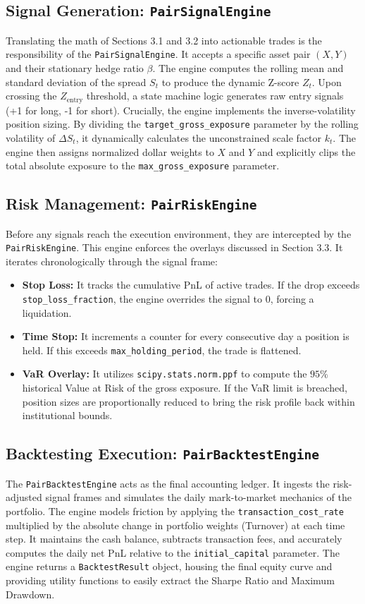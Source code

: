 \documentclass[12pt,a4paper]{article}
\begin{document}
\subsection{Signal Generation: \texttt{PairSignalEngine}}
Translating the math of Sections 3.1 and 3.2 into actionable trades is the responsibility of the \texttt{PairSignalEngine}. It accepts a specific asset pair $(X, Y)$ and their stationary hedge ratio $\beta$. 
The engine computes the rolling mean and standard deviation of the spread $S_t$ to produce the dynamic Z-score $Z_t$. Upon crossing the $Z_{\text{entry}}$ threshold, a state machine logic generates raw entry signals (+1 for long, -1 for short). Crucially, the engine implements the inverse-volatility position sizing. By dividing the \texttt{target\_gross\_exposure} parameter by the rolling volatility of $\Delta S_t$, it dynamically calculates the unconstrained scale factor $k_t$. The engine then assigns normalized dollar weights to $X$ and $Y$ and explicitly clips the total absolute exposure to the \texttt{max\_gross\_exposure} parameter.

\subsection{Risk Management: \texttt{PairRiskEngine}}
Before any signals reach the execution environment, they are intercepted by the \texttt{PairRiskEngine}. This engine enforces the overlays discussed in Section 3.3. It iterates chronologically through the signal frame:
\begin{itemize}
    \item \textbf{Stop Loss:} It tracks the cumulative PnL of active trades. If the drop exceeds \texttt{stop\_loss\_fraction}, the engine overrides the signal to $0$, forcing a liquidation.
    \item \textbf{Time Stop:} It increments a counter for every consecutive day a position is held. If this exceeds \texttt{max\_holding\_period}, the trade is flattened.
    \item \textbf{VaR Overlay:} It utilizes \texttt{scipy.stats.norm.ppf} to compute the $95\%$ historical Value at Risk of the gross exposure. If the VaR limit is breached, position sizes are proportionally reduced to bring the risk profile back within institutional bounds.
\end{itemize}

\subsection{Backtesting Execution: \texttt{PairBacktestEngine}}
The \texttt{PairBacktestEngine} acts as the final accounting ledger. It ingests the risk-adjusted signal frames and simulates the daily mark-to-market mechanics of the portfolio. 
The engine models friction by applying the \texttt{transaction\_cost\_rate} multiplied by the absolute change in portfolio weights (Turnover) at each time step. It maintains the cash balance, subtracts transaction fees, and accurately computes the daily net PnL relative to the \texttt{initial\_capital} parameter. The engine returns a \texttt{BacktestResult} object, housing the final equity curve and providing utility functions to easily extract the Sharpe Ratio and Maximum Drawdown.
\end{document}
